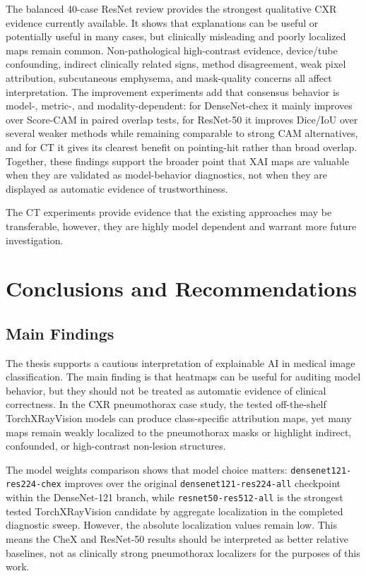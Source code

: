 The balanced 40-case ResNet review provides the strongest qualitative
CXR evidence currently available. It shows that explanations can be
useful or potentially useful in many cases, but clinically misleading
and poorly localized maps remain common. Non-pathological high-contrast
evidence, device/tube confounding, indirect clinically related signs,
method disagreement, weak pixel attribution, subcutaneous emphysema, and
mask-quality concerns all affect interpretation. The improvement experiments 
add that consensus behavior is model-,
metric-, and modality-dependent: for DenseNet-chex it mainly improves
over Score-CAM in paired overlap tests, for ResNet-50 it improves
Dice/IoU over several weaker methods while remaining comparable to
strong CAM alternatives, and for CT it gives its clearest benefit on
pointing-hit rather than broad overlap. Together, these findings support
the broader point that XAI maps are valuable when they are
validated as model-behavior diagnostics, not when they are displayed as
automatic evidence of trustworthiness.

The CT experiments provide evidence that the existing approaches 
may be transferable, however, they are highly model dependent and 
warrant more future investigation.

\hypertarget{conclusions-and-recommendations}{%
	\chapter{Conclusions and
		Recommendations}\label{conclusions-and-recommendations}}

\hypertarget{main-findings}{%
	\section{Main Findings}\label{main-findings}}

The thesis supports a cautious interpretation of explainable AI in
medical image classification. The main finding is that heatmaps can be
useful for auditing model behavior, but they should not be treated as
automatic evidence of clinical correctness. In the CXR pneumothorax case
study, the tested off-the-shelf TorchXRayVision models can produce
class-specific attribution maps, yet many maps remain weakly localized
to the pneumothorax masks or highlight indirect, confounded, or
high-contrast non-lesion structures.

The model weights comparison shows that model choice matters: 
\texttt{densenet121-\allowbreak res224-\allowbreak chex} improves over the original
\texttt{densenet121-\allowbreak res224-\allowbreak all} checkpoint within the DenseNet-121
branch, while \texttt{resnet50-\allowbreak res512-\allowbreak all} is the strongest tested
TorchXRayVision candidate by aggregate localization in the completed
diagnostic sweep. However, the absolute localization values remain low.
This means the CheX and ResNet-50 results should be interpreted as
better relative baselines, not as clinically strong pneumothorax
localizers for the purposes of this work.

